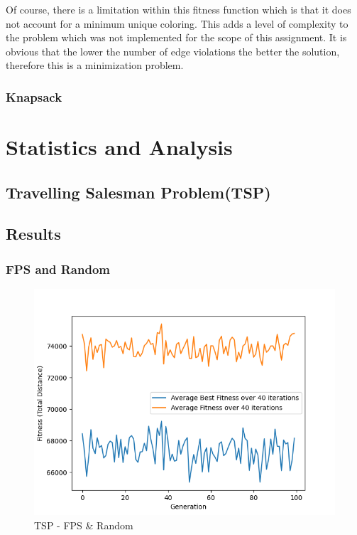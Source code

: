 \documentclass[11pt, letterpaper]{article}
\begin{document}
Of course, there is a limitation within this fitness function which is that it does not account for a minimum unique coloring. This adds a level of complexity to the problem which was not implemented for the scope of this assignment. It is obvious that the lower the number of edge violations the better the solution, therefore this is a minimization problem.
\subsubsection{Knapsack}

\section{Statistics and Analysis}

\subsection{Travelling Salesman Problem(TSP)}

\subsection{Results} 
\subsubsection {FPS and Random}
\begin{figure}[H]
    \centering
    \includegraphics[scale = 0.6]{images/tsp_fp_rd.png}
    \caption {TSP - FPS \& Random}
    \label {fig:tpsFR}
\end{figure}
\end{document}
